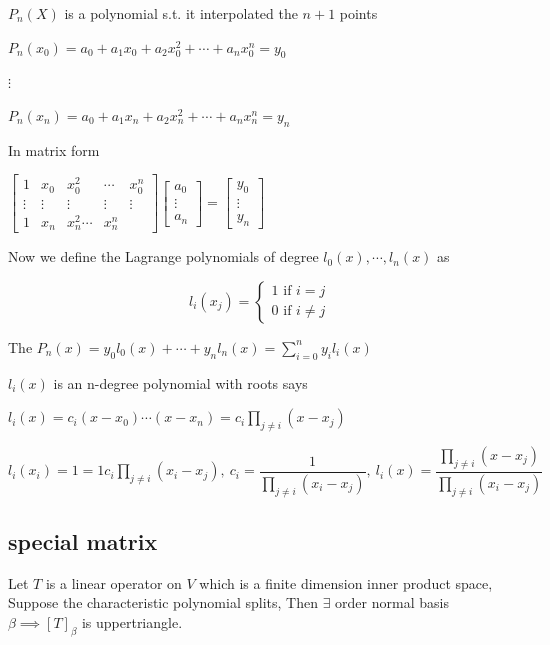$P_n(X)$ is a polynomial s.t. it interpolated the $n+1$ points

$P_n(x_0) = a_0 + a_1x_0 + a_2x_0^2 + \cdots + a_nx_0^n = y_0$

$\vdots$

$P_n(x_n) = a_0 + a_1x_n + a_2x_n^2 + \cdots + a_nx_n^n = y_n$

\newpage

In matrix form 

$\left[ \begin{matrix}
	1&x_0&x_0^2&\cdots&x_0^n\\
	\vdots&\vdots&\vdots&\vdots&\vdots\\
	1&x_n&x_n^2\cdots&x_n^n
\end{matrix}\right] \left[\begin{matrix}
	a_0\\\vdots\\a_n
\end{matrix}\right] = \left[\begin{matrix}
	y_0\\\vdots\\y_n
\end{matrix}\right]$

Now we define the Lagrange polynomials of degree $l_0(x),\cdots,l_n(x)$ as 

$$l_i(x_j) = \begin{cases}
	1 \text{ if } i=j\\0 \text{ if } i \neq j
\end{cases}$$

The $P_n(x) = y_0l_0(x)+\cdots+y_nl_n(x) = \sum^n_{i=0}y_il_i(x)$

$l_i(x)$ is an n-degree polynomial with roots says 

$l_i(x) = c_i(x-x_0)\cdots(x-x_n) = c_i \prod_{j\neq i}(x-x_j)$

$l_i(x_i)=1=1c_i \prod_{j\neq i}(x_i - x_j),~ c_i = \dfrac{1}{\prod_{j\neq i}(x_i-x_j)},~l_i(x) = \dfrac{\prod_{j \neq i}(x-x_j)}{\prod_{j\neq i}(x_i-x_j)}$

\subsection{special matrix}

\begin{thm*}
	Let $T$ is a linear operator on $V$ which is a finite dimension inner product space, Suppose the characteristic polynomial splits, Then $\exists$ order normal basis $\beta \implies [T]_{\beta}$ is uppertriangle.
\end{thm*}


